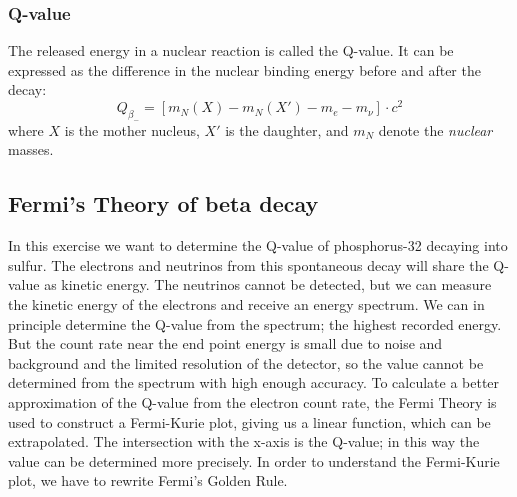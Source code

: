 \documentclass[a4,11pt, notitlepage]{article}
\begin{document}
\subsubsection{Q-value}

The released energy in a nuclear reaction is called the Q-value. It can be expressed as the difference in the nuclear binding energy before and after the decay: \begin{equation}
  Q_{\beta_-}=[m_{N}(X)-m_{N}(X')-m_e-m_{\nu}]\cdot c^2
\end{equation}
where $X$ is the mother nucleus, $X'$ is the daughter, and $m_N$
denote the \textit{nuclear} masses. 


%
%
%


\subsection{Fermi's Theory of beta decay}

In this exercise we want to determine the Q-value of phosphorus-32
decaying into sulfur. The electrons and neutrinos from this
spontaneous decay will share the Q-value as kinetic energy. The
neutrinos cannot be detected, but we can measure the kinetic energy of
the electrons and receive an energy spectrum. We can in principle
determine the Q-value from the spectrum; the highest recorded
energy. But the count rate near the end point energy is small due to
noise and background and the limited resolution of the detector, so
the value cannot be determined from the spectrum with high enough
accuracy. To calculate a better approximation of the Q-value from the
electron count rate, the Fermi Theory is used to construct a
Fermi-Kurie plot, giving us a linear function, which can be
extrapolated. The intersection with the x-axis is the Q-value; in this
way the value can be determined more precisely. In order to understand
the Fermi-Kurie plot, we have to rewrite Fermi's Golden Rule.
\end{document}
